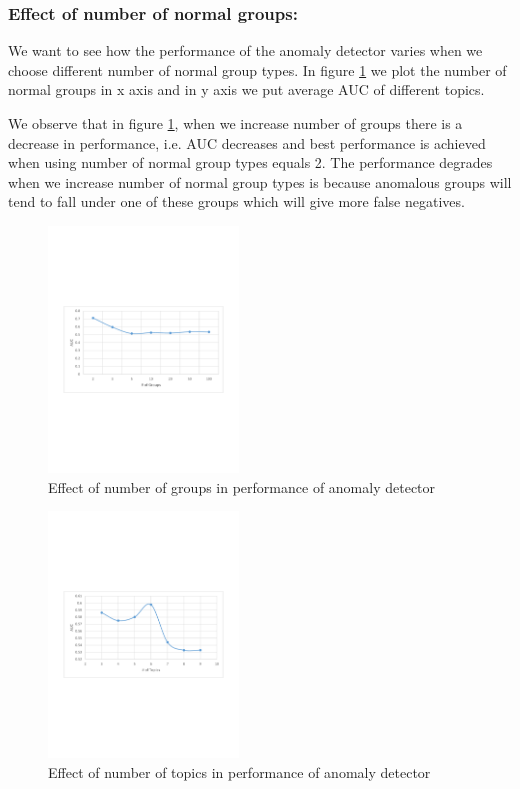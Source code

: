 \documentclass[letterpaper]{article}
\begin{document}
\subsubsection{Effect of number of normal groups:} We want to see how the performance of the anomaly detector varies when we choose different number of normal group types. In figure \ref{effectGroups} we plot the number of normal groups in x axis and in y axis we put average AUC of different topics.

We observe that in figure \ref{effectGroups}, when we increase number of groups there is a decrease in performance, i.e. AUC decreases and best performance is achieved when using number of normal group types equals 2. The performance degrades when we increase number of normal group types is because anomalous groups will tend to fall under one of these groups which will give more false negatives.

\begin{figure}
\begin{center}
\includegraphics[bb = 70 270 550 530,clip=true,width=0.45\textwidth]{ResultGroupVsAUC.pdf}
\end{center}
\caption{Effect of number of groups in performance of anomaly detector}\label{effectGroups}
\end{figure}

\begin{figure}
\begin{center}
\includegraphics[bb = 70 270 550 530,clip=true,width=0.45\textwidth]{ResultTopicVsAuc.pdf}
\end{center}
\caption{Effect of number of topics in performance of anomaly detector}\label{effectTopics}
\end{figure}
\end{document}
